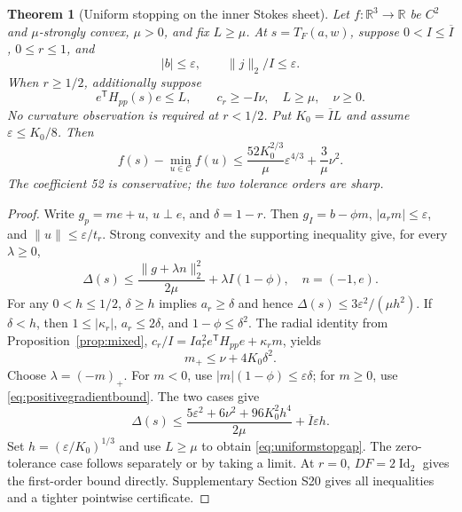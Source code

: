 \documentclass[pdflatex,sn-mathphys-num]{sn-jnl}
\newtheorem{theorem}{Theorem}
\begin{document}
\begin{theorem}[Uniform stopping on the inner Stokes sheet]
\label{thm:uniformstopping}
Let $f:\mathbb R^3\to\mathbb R$ be $C^2$ and $\mu$-strongly convex, $\mu>0$, and fix $L\ge\mu$. At $s=T_F(a,w)$, suppose $0<I\le\overline I$, $0\le r\le1$, and
\begin{equation}
 |b|\le\varepsilon,\qquad \|j\|_2/I\le\varepsilon.
 \label{eq:normalizedstop}
\end{equation}
When $r\ge1/2$, additionally suppose
\begin{equation}
 e^{\mathsf T}H_{pp}(s)e\le L,\qquad c_r\ge-I\nu,
 \quad L\ge\mu,\quad \nu\ge0.
 \label{eq:radialstop}
\end{equation}
No curvature observation is required at $r<1/2$. Put $K_0=\overline I L$ and assume $\varepsilon\le K_0/8$. Then
\begin{equation}
 \boxed{\ f(s)-\min_{u\in\mathcal C}f(u)
 \le \frac{52K_0^{2/3}}{\mu}\varepsilon^{4/3}
       +\frac{3}{\mu}\nu^2.\ }
 \label{eq:uniformstopgap}
\end{equation}
The coefficient 52 is conservative; the two tolerance orders are sharp.
\end{theorem}
\begin{proof}
Write $g_p=me+u$, $u\perp e$, and $\delta=1-r$. Then $g_I=b-\phi m$, $|a_rm|\le\varepsilon$, and $\|u\|\le\varepsilon/t_r$. Strong convexity and the supporting inequality give, for every $\lambda\ge0$,
\begin{equation}
 \Delta(s)\le\frac{\|g+\lambda n\|_2^2}{2\mu}
                  +\lambda I(1-\phi),\quad n=(-1,e).
 \label{eq:strongstopdual}
\end{equation}
For any $0<h\le1/2$, $\delta\ge h$ implies $a_r\ge\delta$ and hence $\Delta(s)\le3\varepsilon^2/(\mu h^2)$. If $\delta<h$, then $1\le|\kappa_r|$, $a_r\le2\delta$, and $1-\phi\le\delta^2$. The radial identity from Proposition~\ref{prop:mixed}, $c_r/I=Ia_r^2 e^{\mathsf T}H_{pp}e+\kappa_r m$, yields
\begin{equation}
 m_+\le\nu+4K_0\delta^2.
 \label{eq:positivegradientbound}
\end{equation}
Choose $\lambda=(-m)_+$. For $m<0$, use $|m|(1-\phi)\le\varepsilon\delta$; for $m\ge0$, use \eqref{eq:positivegradientbound}. The two cases give
\begin{equation}
 \Delta(s)\le\frac{5\varepsilon^2+6\nu^2+96K_0^2h^4}{2\mu}
                  +\overline I\varepsilon h.
 \label{eq:bandstopgap}
\end{equation}
Set $h=(\varepsilon/K_0)^{1/3}$ and use $L\ge\mu$ to obtain \eqref{eq:uniformstopgap}. The zero-tolerance case follows separately or by taking a limit. At $r=0$, $DF=2\operatorname{Id}_2$ gives the first-order bound directly. Supplementary Section S20 gives all inequalities and a tighter pointwise certificate.
\end{proof}
\end{document}
